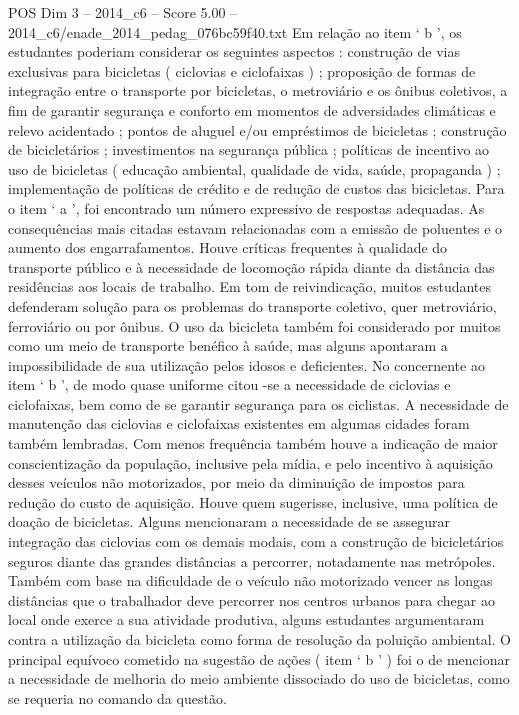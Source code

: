 \begin{textsample}{POS Dim 3 – 2014\_c6 – Score 5.00 – 2014\_c6/enade\_2014\_pedag\_076bc59f40.txt}
Em relação ao item ‘ b ’, os estudantes poderiam considerar os seguintes aspectos : construção de vias exclusivas para bicicletas ( ciclovias e ciclofaixas ) ; proposição de formas de integração entre o transporte por bicicletas, o metroviário e os ônibus coletivos, a fim de garantir segurança e conforto em momentos de adversidades climáticas e relevo acidentado ; pontos de aluguel e/ou empréstimos de bicicletas ; construção de bicicletários ; investimentos na segurança pública ; políticas de incentivo ao uso de bicicletas ( educação ambiental, qualidade de vida, saúde, propaganda ) ; implementação de políticas de crédito e de redução de custos das bicicletas.
Para o item ‘ a ’, foi encontrado um número expressivo de respostas adequadas.
As consequências mais citadas estavam relacionadas com a emissão de poluentes e o aumento dos engarrafamentos.
Houve críticas frequentes à qualidade do transporte público e à necessidade de locomoção rápida diante da distância das residências aos locais de trabalho.
Em tom de reivindicação, muitos estudantes defenderam solução para os problemas do transporte coletivo, quer metroviário, ferroviário ou por ônibus.
O uso da bicicleta também foi considerado por muitos como um meio de transporte benéfico à saúde, mas alguns apontaram a impossibilidade de sua utilização pelos idosos e deficientes.
No concernente ao item ‘ b ’, de modo quase uniforme citou -se a necessidade de ciclovias e ciclofaixas, bem como de se garantir segurança para os ciclistas.
A necessidade de manutenção das ciclovias e ciclofaixas existentes em algumas cidades foram também lembradas.
Com menos frequência também houve a indicação de maior conscientização da população, inclusive pela mídia, e pelo incentivo à aquisição desses veículos não motorizados, por meio da diminuição de impostos para redução do custo de aquisição.
Houve quem sugerisse, inclusive, uma política de doação de bicicletas.
Alguns mencionaram a necessidade de se assegurar integração das ciclovias com os demais modais, com a construção de bicicletários seguros diante das grandes distâncias a percorrer, notadamente nas metrópoles.
Também com base na dificuldade de o veículo não motorizado vencer as longas distâncias que o trabalhador deve percorrer nos centros urbanos para chegar ao local onde exerce a sua atividade produtiva, alguns estudantes argumentaram contra a utilização da bicicleta como forma de resolução da poluição ambiental.
O principal equívoco cometido na sugestão de ações ( item ‘ b ’ ) foi o de mencionar a necessidade de melhoria do meio ambiente dissociado do uso de bicicletas, como se requeria no comando da questão.

\end{textsample}
